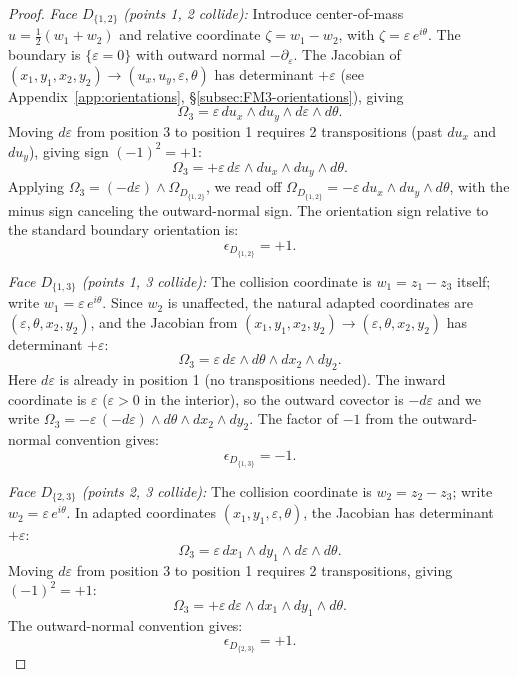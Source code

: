 \begin{proof}
\medskip\noindent\emph{Face $D_{\{1,2\}}$ (points 1, 2 collide):}
Introduce center-of-mass $u = \frac{1}{2}(w_1 + w_2)$ and relative coordinate $\zeta = w_1 - w_2$, with $\zeta = \varepsilon\, e^{i\theta}$. The boundary is $\{\varepsilon = 0\}$ with outward normal $-\partial_\varepsilon$. The Jacobian of $(x_1, y_1, x_2, y_2) \to (u_x, u_y, \varepsilon, \theta)$ has determinant $+\varepsilon$ (see Appendix~\ref{app:orientations}, \S\ref{subsec:FM3-orientations}), giving
\[
\Omega_3 = \varepsilon\, du_x \wedge du_y \wedge d\varepsilon \wedge d\theta.
\]
Moving $d\varepsilon$ from position 3 to position 1 requires 2 transpositions (past $du_x$ and $du_y$), giving sign $(-1)^2 = +1$:
\[
\Omega_3 = +\varepsilon\, d\varepsilon \wedge du_x \wedge du_y \wedge d\theta.
\]
Applying $\Omega_3 = (-d\varepsilon) \wedge \Omega_{D_{\{1,2\}}}$, we read off $\Omega_{D_{\{1,2\}}} = -\varepsilon\, du_x \wedge du_y \wedge d\theta$, with the minus sign canceling the outward-normal sign. The orientation sign relative to the standard boundary orientation is:
\[
\boxed{\epsilon_{D_{\{1,2\}}} = +1.}
\]

\medskip\noindent\emph{Face $D_{\{1,3\}}$ (points 1, 3 collide):}
The collision coordinate is $w_1 = z_1 - z_3$ itself; write $w_1 = \varepsilon\, e^{i\theta}$. Since $w_2$ is unaffected, the natural adapted coordinates are $(\varepsilon, \theta, x_2, y_2)$, and the Jacobian from $(x_1, y_1, x_2, y_2) \to (\varepsilon, \theta, x_2, y_2)$ has determinant $+\varepsilon$:
\[
\Omega_3 = \varepsilon\, d\varepsilon \wedge d\theta \wedge dx_2 \wedge dy_2.
\]
Here $d\varepsilon$ is already in position 1 (no transpositions needed). The inward coordinate is $\varepsilon$ ($\varepsilon > 0$ in the interior), so the outward covector is $-d\varepsilon$ and we write $\Omega_3 = -\varepsilon\,(-d\varepsilon) \wedge d\theta \wedge dx_2 \wedge dy_2$. The factor of $-1$ from the outward-normal convention gives:
\[
\boxed{\epsilon_{D_{\{1,3\}}} = -1.}
\]

\medskip\noindent\emph{Face $D_{\{2,3\}}$ (points 2, 3 collide):}
The collision coordinate is $w_2 = z_2 - z_3$; write $w_2 = \varepsilon\, e^{i\theta}$. In adapted coordinates $(x_1, y_1, \varepsilon, \theta)$, the Jacobian has determinant $+\varepsilon$:
\[
\Omega_3 = \varepsilon\, dx_1 \wedge dy_1 \wedge d\varepsilon \wedge d\theta.
\]
Moving $d\varepsilon$ from position 3 to position 1 requires 2 transpositions, giving $(-1)^2 = +1$:
\[
\Omega_3 = +\varepsilon\, d\varepsilon \wedge dx_1 \wedge dy_1 \wedge d\theta.
\]
The outward-normal convention gives:
\[
\boxed{\epsilon_{D_{\{2,3\}}} = +1.}
\]


\end{proof}
